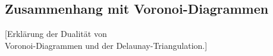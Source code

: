 \subsection{Zusammenhang mit Voronoi-Diagrammen}
[Erklärung der Dualität von \\
Voronoi-Diagrammen und der Delaunay-Triangulation.]
